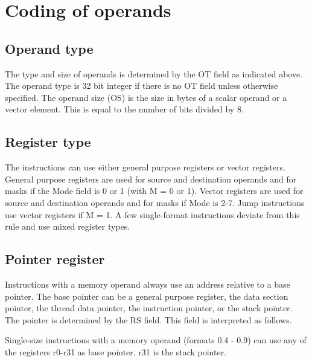 \documentclass[forwardcom.tex]{subfiles}
\begin{document}

\vv
\section{Coding of operands}
\subsection{Operand type}
The type and size of operands is determined by the OT field as indicated above. The operand type is 32 bit integer if there is no OT field unless otherwise specified. The operand size (OS) is the size in bytes of a scalar operand or a vector element. This is equal to the number of bits divided by 8.

\subsection{Register type}
The instructions can use either general purpose registers or vector registers. General purpose registers are used for source and destination operands and for masks if the Mode field is 0 or 1 (with M = 0 or 1). Vector registers are used for source and destination operands and for masks if Mode is 2-7. Jump instructions use vector registers if M = 1. A few single-format instructions deviate from this rule and use mixed register types.

\subsection{Pointer register}
Instructions with a memory operand always use an address relative to a base pointer. The base pointer can be a general purpose register, the data section pointer, the thread data pointer, the instruction pointer, or the stack pointer. The pointer is determined by the RS field. This field is interpreted as follows.
\vv

Single-size instructions with a memory operand (formats 0.4 - 0.9) can use any of the registers r0-r31 as base pointer. r31 is the stack pointer.
\vv
\end{document}
